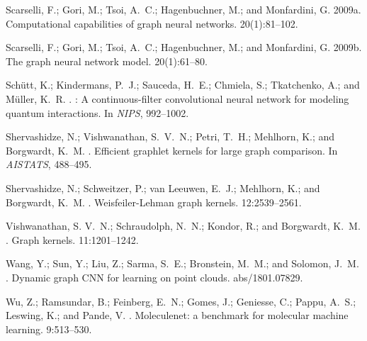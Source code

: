 \documentclass[letterpaper]{article}
\theoremstyle{definition}
\begin{document}
\begin{thebibliography}{}
	Scarselli, F.; Gori, M.; Tsoi, A.~C.; Hagenbuchner, M.; and Monfardini, G.
	\newblock 2009a.
	\newblock Computational capabilities of graph neural networks.
	 20(1):81--102.
	
	Scarselli, F.; Gori, M.; Tsoi, A.~C.; Hagenbuchner, M.; and Monfardini, G.
	\newblock 2009b.
	\newblock The graph neural network model.
	 20(1):61--80.
	
	Sch{\"{u}}tt, K.; Kindermans, P.~J.; Sauceda, H.~E.; Chmiela, S.; Tkatchenko,
	A.; and M{\"{u}}ller, K.~R.
	.
	: A continuous-filter convolutional neural network for
	modeling quantum interactions.
	\newblock In {\em NIPS},  992--1002.
	
	Shervashidze, N.; Vishwanathan, S.~V.~N.; Petri, T.~H.; Mehlhorn, K.; and
	Borgwardt, K.~M.
	.
	\newblock Efficient graphlet kernels for large graph comparison.
	\newblock In {\em AISTATS},  488--495.
	
	Shervashidze, N.; Schweitzer, P.; van Leeuwen, E.~J.; Mehlhorn, K.; and
	Borgwardt, K.~M.
	.
	\newblock Weisfeiler-{L}ehman graph kernels.
	 12:2539--2561.
	
	Vishwanathan, S. V.~N.; Schraudolph, N.~N.; Kondor, R.; and Borgwardt, K.~M.
	.
	\newblock Graph kernels.
	 11:1201--1242.
	
	Wang, Y.; Sun, Y.; Liu, Z.; Sarma, S.~E.; Bronstein, M.~M.; and Solomon, J.~M.
	.
	\newblock Dynamic graph {{CNN}} for learning on point clouds.
	 abs/1801.07829.
	
	Wu, Z.; Ramsundar, B.; Feinberg, E.~N.; Gomes, J.; Geniesse, C.; Pappu, A.~S.;
	Leswing, K.; and Pande, V.
	.
	\newblock Moleculenet: a benchmark for molecular machine learning.
	 9:513--530.
	

\end{thebibliography}
\end{document}
